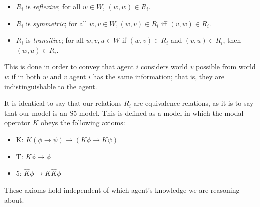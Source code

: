 \documentclass[10pt, a4paper]{report}
\begin{document}
\begin{itemize}
\item $R_i$ is \emph{reflexive}; for all $w \in W$, $(w, w) \in R_i$.
\item $R_i$ is \emph{symmetric}; for all $w, v \in W, (w, v) \in R_i$ iff $(v,
  w) \in R_i$.
\item $R_i$ is \emph{transitive}; for all $w, v, u \in W$ if $(w, v) \in R_i$
  and $(v, u) \in R_i$, then $(w, u) \in R_i$.
\end{itemize}

This is done in order to convey that agent $i$ considers world $v$ possible from
world $w$ if in both $w$ and $v$ agent $i$ has the same information; that is,
they are indistinguishable to the agent.

It is identical to say that our relations $R_i$ are equivalence relations, as it
is to say that our model is an \textsf{S5} model. This is defined as a model in
which the modal operator $K$ obeys the following axioms:

\begin{itemize}
\item \textsf{K}: $K (\phi \rightarrow \psi) \rightarrow (K \phi \rightarrow K
  \psi)$
\item \textsf{T}: $K \phi \rightarrow \phi$
\item \textsf{5}: $\widehat K \phi \rightarrow K \widehat K \phi$
\end{itemize}

These axioms hold independent of which agent's knowledge we are reasoning about. 

\bigskip \bigskip \bigskip

\begin{figure}[h]
  \centering
  \label{fig:EgS5}
  \caption{}
\end{figure}
\end{document}
